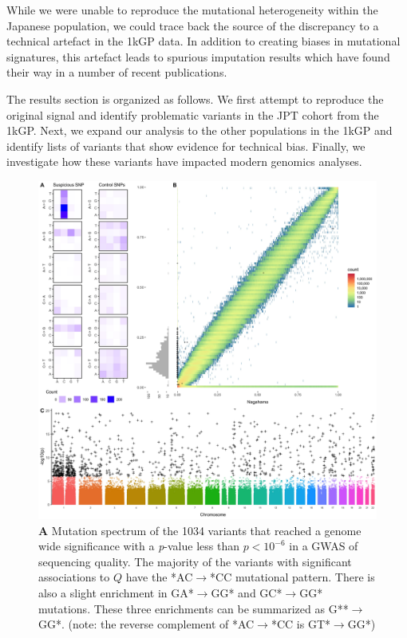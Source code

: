 \documentclass[9pt,lineno]{elife}
\begin{document}
While we were unable to reproduce the mutational heterogeneity within the Japanese population, we could trace back the source of the discrepancy to a technical artefact in the 1kGP data.
In addition to creating biases in mutational signatures, this artefact leads to spurious imputation results which have found their way in a number of recent publications.


The results section is organized as follows.
We first attempt to reproduce the original signal and identify problematic variants in the JPT cohort from the 1kGP. 
Next, we expand our analysis to the other populations in the 1kGP and identify lists of variants that show evidence for technical bias.
Finally, we investigate how these variants have impacted modern genomics analyses.  
  

\begin{figure}
\includegraphics[width=\hsize,keepaspectratio]{./Figures/Figure1.jpg}
\caption{
\textbf{A} 
Mutation spectrum of the 1034 variants that reached a genome wide significance with a \textit{p}-value less than $p < 10^{-6}$  in a GWAS of sequencing quality. 
The majority of the variants with significant associations to $Q$ have the *AC${\rightarrow}$*CC mutational pattern. There is also a slight enrichment in GA*${\rightarrow}$GG* and GC*${\rightarrow}$GG* mutations. These three enrichments can be summarized as G**${\rightarrow}$GG*. (note: the reverse complement of *AC${\rightarrow}$*CC is GT*${\rightarrow}$GG*)
}
\end{figure}
\end{document}
